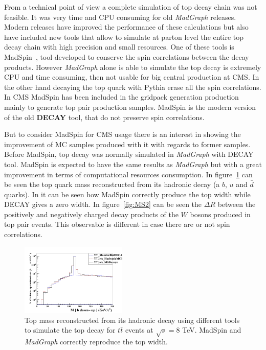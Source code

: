 From a technical point of view a complete simulation of top decay chain was not feasible. It was very time and CPU consuming for old \textit{MadGraph} releases. Modern releases have improved the performance of these calculations but also have included new tools that allow to simulate at parton level the entire top decay chain with high precision and small resources. One of these tools is MadSpin~\cite{Artoisenet:2012st, Frixione:2007zp}, tool developed to conserve the spin correlations between the decay products. However \textit{MadGraph} alone is able to simulate the top decay is extremely CPU and time consuming, then not usable for big central production at CMS. In the other hand decaying the top quark with Pythia erase all the spin correlations. In CMS MadSpin has been included in the gridpack generation production mainly to generate top pair production samples. MadSpin is the modern version of the old \textbf{DECAY} tool, that do not preserve spin correlations.

But to consider MadSpin for CMS usage there is an interest in showing the improvement of MC samples produced with it with regards to former samples. Before MadSpin, top decay was normally simulated in \textit{MadGraph} with DECAY tool. MadSpin is expected to have the same results as \textit{MadGraph} but with a great improvement in terms of computational resources consumption. In figure~\ref{fig:MS1} can be seen the top quark mass reconstructed from its hadronic decay (a $b$, $u$ and $\bar{d}$ quarks). In it can be seen how MadSpin correctly produce the top width while DECAY gives a zero width. In figure~\ref{fig:MS2} can be seen the $\Delta R$ between the positively and negatively charged decay products of the $W$ bosons produced in top pair events. This observable is different in case there are or not spin correlations. 

\begin{figure}[!Hhtbp]
  \begin{center}
    \includegraphics[width=0.45\textwidth]{figs/TT_MadSPin_1.png}
    \caption{Top mass reconstructed from its hadronic decay using different tools to simulate the top decay for $t\bar{t}$ events at $\sqrt{s}=8$ TeV. MadSpin and \textit{MadGraph} correctly reproduce the top width.}
    \label{fig:MS1}
  \end{center}
\end{figure}

